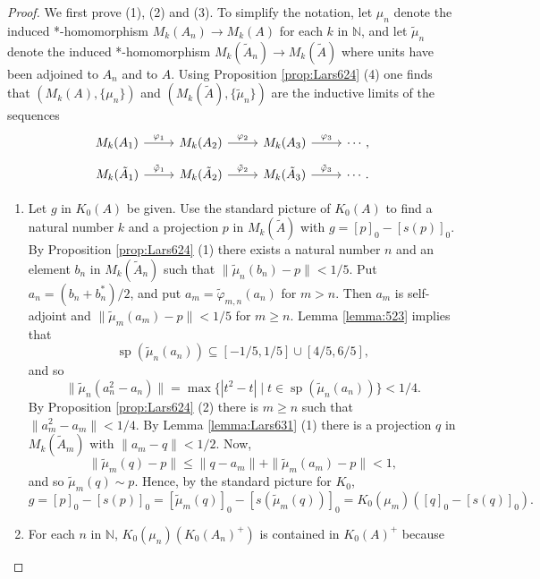 \documentclass{book}
\begin{document}
\begin{proof}
  We first prove (1), (2) and (3). To simplify the notation, let \(\mu_n\)
  denote the induced *-homomorphism \(M_k(A_n)\to M_k(A)\) for each \(k\) in \(\mathbb{N}\),
  and let \(\tilde{\mu}_n\) denote the induced *-homomorphism \(M_k(\tilde{A}_n)\to M_k(\tilde{A})\)
  where units have been adjoined to \(A_n\) and to \(A\). Using Proposition \ref{prop:Lars624} (4)
  one finds that \((M_k(A),\{\mu_n\})\) and \((M_k(\tilde{A}),\{\tilde{\mu}_n\})\) are the inductive limits of the sequences
  \[\begin{tikzcd}
      M_k(A_1)\arrow[r,"\varphi_1"]&M_k(A_2)\arrow[r,"\varphi_2"]&M_k(A_3)\arrow[r,"\varphi_3"]&\cdots,
    \end{tikzcd}\]
    \[\begin{tikzcd}
      M_k(\tilde{A}_1)\arrow[r,"\tilde{\varphi}_1"]&M_k(\tilde{A}_2)\arrow[r,"\tilde{\varphi}_2"]&M_k(\tilde{A}_3)\arrow[r,"\tilde{\varphi}_3"]&\cdots.
    \end{tikzcd}\]
  \begin{enumerate}
    \item Let \(g\) in \(K_0(A)\) be given. Use the standard picture of \(K_0(A)\) to find
      a natural number \(k\) and a projection \(p\) in \(M_k(\tilde{A})\) with \(g={[p]}_0-{[s(p)]}_0\).
      By Proposition \ref{prop:Lars624} (1) there exists a natural number \(n\) and an element \(b_n\) in \(M_k(\tilde{A}_n)\)
      such that \(\|\tilde{\mu}_n(b_n)-p\|<1/5\). Put \(a_n=(b_n+b_n^*)/2\), and put 
      \(a_m=\tilde{\varphi}_{m,n}(a_n)\) for \(m>n\). Then \(a_m\) is self-adjoint and \(\|\tilde{\mu}_m(a_m)-p\|<1/5\)
      for \(m\geq n\). Lemma \ref{lemma:523} implies that
      \[
        \operatorname{sp}(\tilde{\mu}_n(a_n))\subseteq[-1/5,1/5]\cup[4/5,6/5],
      \]
      and so 
      \[
        \|\tilde{\mu}_n(a_n^2-a_n)\|=\max\{|t^2-t|\mid t\in\operatorname{sp}(\tilde{\mu}_n(a_n))\}<1/4.
      \]
      By Proposition \ref{prop:Lars624} (2) there is \(m\geq n\) such that \(\|a_m^2-a_m\|<1/4\).
      By Lemma \ref{lemma:Lars631} (1) there is a projection \(q\) in \(M_k(\tilde{A}_m)\) with 
      \(\|a_m-q\|<1/2\). Now,
      \[
        \|\tilde{\mu}_m(q)-p\|\leq\|q-a_m\|+\|\tilde{\mu}_m(a_m)-p\|<1,
      \]
      and so \(\tilde{\mu}_m(q)\sim p\). Hence, by the standard picture for \(K_0\),
      \[
        g={[p]}_0-{[s(p)]}_0={[\tilde{\mu}_m(q)]}_0-{[s(\tilde{\mu}_m(q))]}_0=K_0(\mu_m)({[q]}_0-{[s(q)]}_0).
      \]
    \item For each \(n\) in \(\mathbb{N}\), \(K_0(\mu_n)(K_0(A_n)^+)\) is contained in \(K_0(A)^+\) because

\end{enumerate}
\end{proof}
\end{document}
